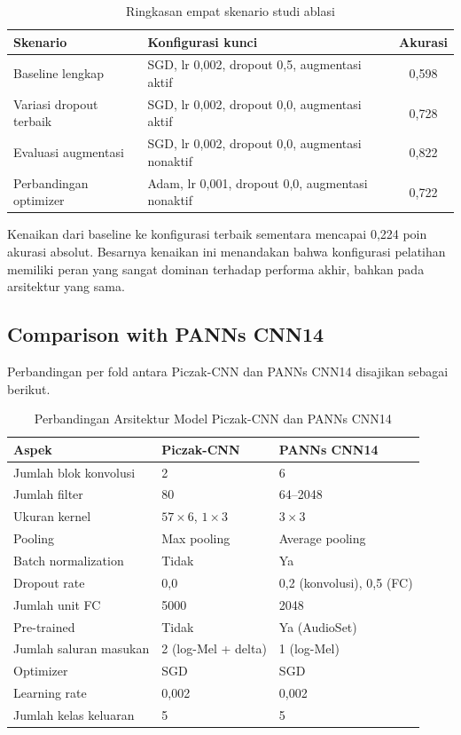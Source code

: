 \documentclass[10pt,a4paper]{jurnalvarian}
\let\LaTeXsubsection\subsection
\def\subsection{\setlength{\leftskip}{0.6cm}\LaTeXsubsection}
\begin{document}
\begin{table}[H]
\centering
\fontsize{8pt}{10pt}\selectfont
\caption{Ringkasan empat skenario studi ablasi}
\begin{tabular}{p{3.7cm}p{6.2cm}c}
\hline
Skenario & Konfigurasi kunci & Akurasi \\
\hline
Baseline lengkap & SGD, lr 0,002, dropout 0,5, augmentasi aktif & 0,598 \\
Variasi dropout terbaik & SGD, lr 0,002, dropout 0,0, augmentasi aktif & 0,728 \\
Evaluasi augmentasi & SGD, lr 0,002, dropout 0,0, augmentasi nonaktif & 0,822 \\
Perbandingan optimizer & Adam, lr 0,001, dropout 0,0, augmentasi nonaktif & 0,722 \\
\hline
\end{tabular}
\end{table}

Kenaikan dari baseline ke konfigurasi terbaik sementara mencapai 0,224 poin akurasi absolut. Besarnya kenaikan ini menandakan bahwa konfigurasi pelatihan memiliki peran yang sangat dominan terhadap performa akhir, bahkan pada arsitektur yang sama.

\subsection{Comparison with PANNs CNN14}
Perbandingan per fold antara Piczak-CNN dan PANNs CNN14 disajikan sebagai berikut.

\begin{table}[H]
\centering
\fontsize{8pt}{10pt}\selectfont
\caption{Perbandingan Arsitektur Model Piczak-CNN dan PANNs CNN14}
\begin{tabular}{p{4.9cm}p{3.2cm}p{3.1cm}}
\hline
Aspek & Piczak-CNN & PANNs CNN14 \\
\hline
Jumlah blok konvolusi & 2 & 6 \\
Jumlah filter & 80 & 64--2048 \\
Ukuran kernel & $57\times6$, $1\times3$ & $3\times3$ \\
Pooling & Max pooling & Average pooling \\
Batch normalization & Tidak & Ya \\
Dropout rate & 0,0 & 0,2 (konvolusi), 0,5 (FC) \\
Jumlah unit FC & 5000 & 2048 \\
Pre-trained & Tidak & Ya (AudioSet) \\
Jumlah saluran masukan & 2 (log-Mel + delta) & 1 (log-Mel) \\
Optimizer & SGD & SGD \\
Learning rate & 0,002 & 0,002 \\
Jumlah kelas keluaran & 5 & 5 \\
\hline
\end{tabular}
\end{table}
\end{document}

